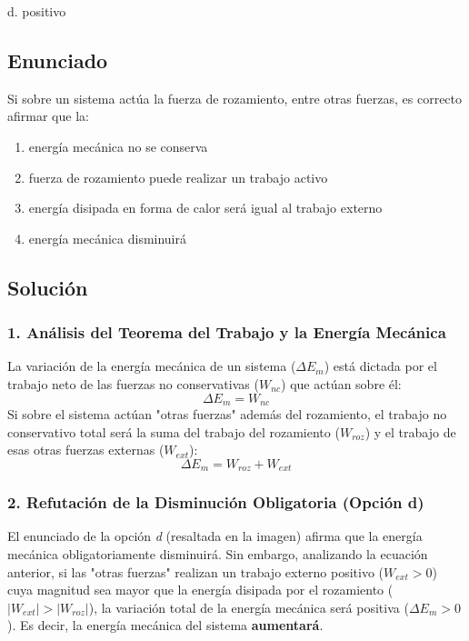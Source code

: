 \documentclass[12pt, a4paper]{article}
\begin{document}
\begin{tcolorbox}[colback=green!5!white, colframe=green!50!black, title=Respuesta Correcta]
\centering \Large d. positivo
\end{tcolorbox}

\newpage

\subsection*{Enunciado}
Si sobre un sistema actúa la fuerza de rozamiento, entre otras fuerzas, es correcto afirmar que la:
\begin{enumerate}[label=\alph*.]
    \item energía mecánica no se conserva
    \item fuerza de rozamiento puede realizar un trabajo activo
    \item energía disipada en forma de calor será igual al trabajo externo
    \item energía mecánica disminuirá
\end{enumerate}

\subsection*{Solución}

\subsubsection*{1. Análisis del Teorema del Trabajo y la Energía Mecánica}
La variación de la energía mecánica de un sistema ($\Delta E_m$) está dictada por el trabajo neto de las fuerzas no conservativas ($W_{nc}$) que actúan sobre él:
$$\Delta E_m = W_{nc}$$
Si sobre el sistema actúan "otras fuerzas" además del rozamiento, el trabajo no conservativo total será la suma del trabajo del rozamiento ($W_{roz}$) y el trabajo de esas otras fuerzas externas ($W_{ext}$):
$$\Delta E_m = W_{roz} + W_{ext}$$

\subsubsection*{2. Refutación de la Disminución Obligatoria (Opción d)}
El enunciado de la opción \textit{d} (resaltada en la imagen) afirma que la energía mecánica obligatoriamente disminuirá. Sin embargo, analizando la ecuación anterior, si las "otras fuerzas" realizan un trabajo externo positivo ($W_{ext} > 0$) cuya magnitud sea mayor que la energía disipada por el rozamiento ($|W_{ext}| > |W_{roz}|$), la variación total de la energía mecánica será positiva ($\Delta E_m > 0$). Es decir, la energía mecánica del sistema \textbf{aumentará}.
\end{document}
